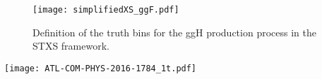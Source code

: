 \begin{figure}[htbp]
\centering
\texttt{[image: simplifiedXS\_ggF.pdf]}
\caption{\label{fig:org09ac44d}
Definition of the truth bins for the ggH production process in the STXS framework.}
\end{figure}

\begin{sidewaystable}
  \centering
  \texttt{[image: ATL-COM-PHYS-2016-1784\_1t.pdf]}
  

\end{sidewaystable}
